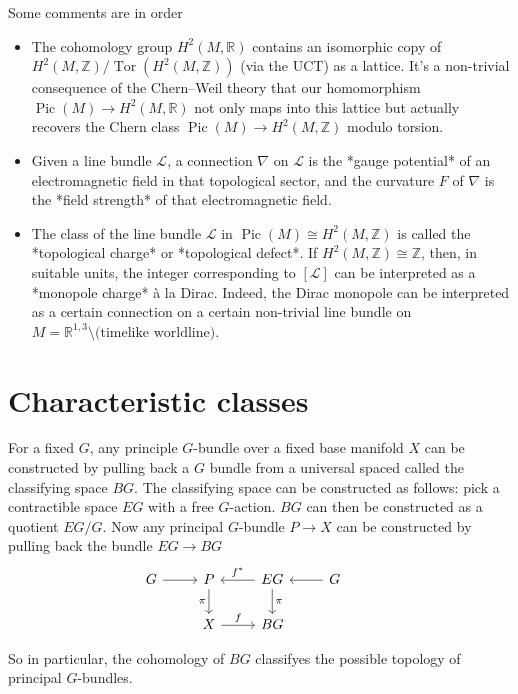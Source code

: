 Some comments are in order
\begin{itemize} 
    \item The cohomology group $H^2(M,\mathbb{R})$ contains an isomorphic copy of $H^2(M,\mathbb{Z})/\operatorname{Tor}(H^2(M,\mathbb{Z}))$ (via the UCT) as a lattice. It’s a non-trivial consequence of the Chern–Weil theory that our homomorphism $\operatorname{Pic}(M) \to H^2(M,\mathbb{R})$ not only maps into this lattice but actually recovers the Chern class $\operatorname{Pic}(M) \to H^2(M,\mathbb{Z})$ modulo torsion.
    \item Given a line bundle $\mathcal{L}$, a connection $\nabla$ on $\mathcal{L}$ is the *gauge potential* of an electromagnetic field in that topological sector, and the curvature $F$ of $\nabla$ is the *field strength* of that electromagnetic field.
    \item The class of the line bundle $\mathcal{L}$ in $\operatorname{Pic}(M) \cong H^2(M,\mathbb{Z})$ is called the *topological charge* or *topological defect*. If $H^2(M,\mathbb{Z}) \cong \mathbb{Z}$, then, in suitable units, the integer corresponding to $[\mathcal{L}]$ can be interpreted as a *monopole charge* à la Dirac. Indeed, the Dirac monopole can be interpreted as a certain connection on a certain non-trivial line bundle on $M = \mathbb{R}^{1,3} \setminus \text{(timelike worldline)}$.
\end{itemize}


\section{Characteristic classes}
\begin{proposition}
    For a fixed $G$, any principle $G$-bundle over a fixed base manifold $X$ can be constructed by pulling back a $G$ bundle from a universal spaced called the classifying space $BG$. The classifying space can be constructed as follows: pick a contractible space $EG$ with a free $G$-action. $BG$ can then be constructed as a quotient $EG/G$. Now any principal $G$-bundle $P\rightarrow X$ can be constructed by pulling back the bundle $EG\rightarrow BG$ 
    \begin{equation}
        \begin{tikzcd}
            G \arrow{r}{} & P  \arrow[swap]{d}{\pi} &\arrow[swap]{l}{f^*}EG \arrow{d}{\pi} &\arrow{l} G \\
            &X\arrow{r}{f}&BG & &
    \end{tikzcd}
    \end{equation}
\end{proposition}
So in particular, the cohomology of $BG$ classifyes the possible topology of principal $G$-bundles.

